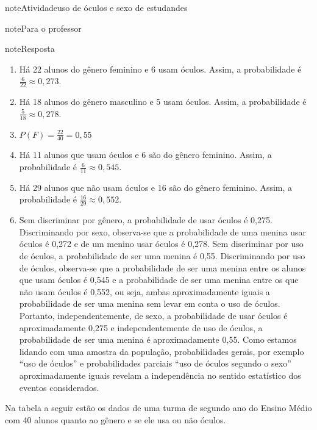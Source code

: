 \begin{sphinxadmonition}{note}{Atividade}{uso de óculos e sexo de estudandes}
\begin{sphinxadmonition}{note}{Para o professor}
\begin{sphinxadmonition}{note}{Resposta}
\begin{enumerate}
\item {} 
Há 22 alunos do gênero feminino e 6 usam óculos. Assim, a probabilidade é \(\frac{6}{22}\approx 0,273\).

\item {} 
Há 18 alunos do gênero masculino e 5 usam óculos. Assim, a probabilidade é \(\frac{5}{18}\approx 0,278\).

\item {} 
\(P(F)=\frac{22}{40}=0,55\)

\item {} 
Há 11 alunos que usam óculos e 6 são do gênero feminino. Assim, a probabilidade é \(\frac{6}{11}\approx 0,545\).

\item {} 
Há 29 alunos que não usam óculos e 16 são do gênero feminino. Assim, a probabilidade é \(\frac{16}{29}\approx 0,552\).

\item {} 
Sem discriminar por gênero, a probabilidade de usar óculos é 0,275. Discriminando por sexo, observa-se que a probabilidade de uma menina usar óculos é 0,272 e de um menino usar óculos é 0,278. Sem discriminar por uso de óculos, a probabilidade de ser uma menina é 0,55. Discriminando por uso de óculos, observa-se que a probabilidade de ser uma menina entre os alunos que usam óculos é 0,545 e a probabilidade de ser uma menina entre os que não usam óculos é 0,552, ou seja, ambas aproximadamente iguais a probabilidade de ser uma menina sem levar em conta o uso de óculos. Portanto, independentemente, de sexo, a probabilidade de usar óculos é aproximadamente 0,275 e independentemente de uso de óculos, a probabilidade de ser uma menina é aproximadamente 0,55. Como estamos lidando com uma amostra da população, probabilidades gerais, por exemplo “uso de óculos” e probabilidades parciais “uso de óculos segundo o sexo” aproximadamente iguais revelam a independência no sentido estatístico dos eventos considerados.

\end{enumerate}
\end{sphinxadmonition}
\end{sphinxadmonition}

Na tabela a seguir estão os dados de uma turma de segundo ano do Ensino Médio com 40 alunos quanto ao gênero e se ele usa ou não óculos.


\begin{savenotes}\sphinxattablestart
\centering
\begin{tabulary}{\linewidth}[t]{|T|T|T|T|}
\hline


\end{tabulary}
\end{savenotes}
\end{sphinxadmonition}
